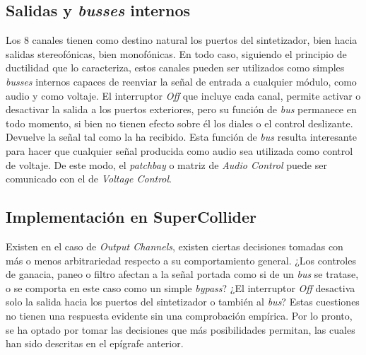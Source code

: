\subsection{Salidas y \textit{busses} internos}
Los 8 canales tienen como destino natural los puertos del sintetizador, bien hacia salidas stereofónicas, bien monofónicas. En todo caso, siguiendo el principio de ductilidad que lo caracteriza, estos canales pueden ser utilizados como simples \textit{busses} internos capaces de reenviar la señal de entrada a cualquier módulo, como audio y como voltaje. El interruptor \textit{Off} que incluye cada canal, permite activar o desactivar la salida a los puertos exteriores, pero su función de \textit{bus} permanece en todo momento, si bien no tienen efecto sobre él los diales o el control deslizante. Devuelve la señal tal como la ha recibido. Esta función de \textit{bus} resulta interesante para hacer que cualquier señal producida como audio sea utilizada como control de voltaje. De este modo, el \textit{patchbay} o matriz de \textit{Audio Control} puede ser comunicado con el de \textit{Voltage Control}.

\subsection{Implementación en SuperCollider}
Existen en el caso de \textit{Output Channels}, existen ciertas decisiones tomadas con más o menos arbitrariedad respecto a su comportamiento general. ¿Los controles  de ganacia, paneo o filtro afectan a la señal portada como si de un \textit{bus} se tratase, o se comporta en este caso como un simple \textit{bypass}? ¿El interruptor \textit{Off} desactiva solo la salida hacia los puertos del sintetizador o también al \textit{bus}? Estas cuestiones no tienen una respuesta evidente sin una comprobación empírica. Por lo pronto, se ha optado por tomar las decisiones que más posibilidades permitan, las cuales han sido descritas en el epígrafe anterior. 